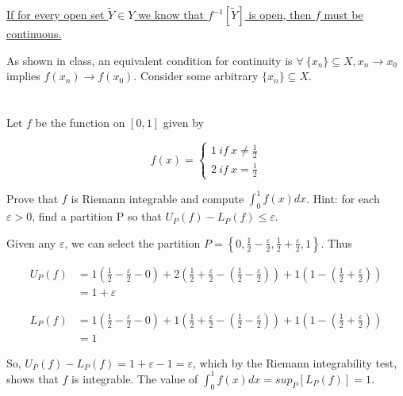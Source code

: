 \documentclass[]{article}
\begin{document}
		\underline{If for every open set $\tilde{Y} \in Y$ we know that $f^{-1}[\tilde{Y}]$ is open, then $f$ must be continuous.}

		As shown in class, an equivalent condition for continuity is $\forall\ \{x_n\} \subseteq X, x_n \to x_0$ implies $f(x_n) \to f(x_0)$. Consider some arbitrary $\{x_n\} \subseteq X$.



	\section{}
		\begin{em}
			Let $f$ be the function on $[0, 1]$ given by 

			\[f(x) = \begin{cases}
				1\ if\ x \neq \frac{1}{2} \\
				2\ if\ x = \frac{1}{2}
			\end{cases}\]

			Prove that $f$ is Riemann integrable and compute $\int_0^1 f(x) dx$. Hint: for each $\varepsilon > 0$, find a partition P so that $U_P(f) - L_P(f) \leq \varepsilon$. 
		\end{em}

		Given any $\varepsilon$, we can select the partition $P = \left \{0, \frac{1}{2} - \frac{\varepsilon}{2}, \frac{1}{2} + \frac{\varepsilon}{2}, 1 \right \}$. Thus

		\begin{align*}
			U_P(f) &= 1 \left (\frac{1}{2} - \frac{\varepsilon}{2} - 0 \right ) + 2\left (\frac{1}{2} + \frac{\varepsilon}{2} - \left (\frac{1}{2} - \frac{\varepsilon}{2}\right ) \right ) + 1\left (1 - \left (\frac{1}{2} + \frac{\varepsilon}{2} \right) \right ) \\
			&= 1 + \varepsilon
		\end{align*}

		\begin{align*}
			L_P(f) &= 1 \left (\frac{1}{2} - \frac{\varepsilon}{2} - 0 \right ) + 1\left (\frac{1}{2} + \frac{\varepsilon}{2} - \left (\frac{1}{2} - \frac{\varepsilon}{2}\right ) \right ) + 1\left (1 - \left (\frac{1}{2} + \frac{\varepsilon}{2} \right) \right ) \\
			&= 1 
		\end{align*}

		So, $U_P(f) - L_P(f) = 1 + \varepsilon - 1 = \varepsilon$, which by the Riemann integrability test, shows that $f$ is integrable. The value of $\int_0^1 f(x) dx = sup_P[ L_P(f) ] = 1$.
\end{document}
